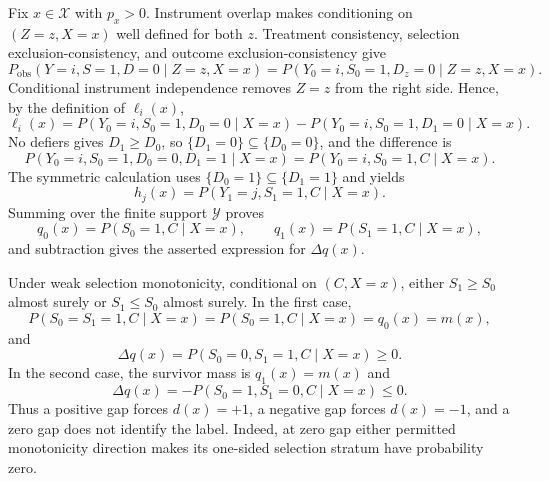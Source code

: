 Fix \(x\in\mathcal X\) with \(p_x>0\).  Instrument overlap makes conditioning on \((Z=z,X=x)\) well defined for both \(z\).  Treatment consistency, selection exclusion-consistency, and outcome exclusion-consistency give
\[
P_{\mathrm{obs}}(Y=i,S=1,D=0\mid Z=z,X=x)
=P(Y_0=i,S_0=1,D_z=0\mid Z=z,X=x).
\]
Conditional instrument independence removes \(Z=z\) from the right side.  Hence, by the definition of \(\ell_i(x)\),
\[
\ell_i(x)=P(Y_0=i,S_0=1,D_0=0\mid X=x)-P(Y_0=i,S_0=1,D_1=0\mid X=x).
\]
No defiers gives \(D_1\ge D_0\), so \(\{D_1=0\}\subseteq\{D_0=0\}\), and the difference is
\[
P(Y_0=i,S_0=1,D_0=0,D_1=1\mid X=x)=P(Y_0=i,S_0=1,C\mid X=x).
\]
The symmetric calculation uses \(\{D_0=1\}\subseteq\{D_1=1\}\) and yields
\[
h_j(x)=P(Y_1=j,S_1=1,C\mid X=x).
\]
Summing over the finite support \(\mathcal Y\) proves
\[
q_0(x)=P(S_0=1,C\mid X=x),\qquad q_1(x)=P(S_1=1,C\mid X=x),
\]
and subtraction gives the asserted expression for \(\Delta q(x)\).

Under weak selection monotonicity, conditional on \((C,X=x)\), either \(S_1\ge S_0\) almost surely or \(S_1\le S_0\) almost surely.  In the first case,
\[
P(S_0=S_1=1,C\mid X=x)=P(S_0=1,C\mid X=x)=q_0(x)=m(x),
\]
and
\[
\Delta q(x)=P(S_0=0,S_1=1,C\mid X=x)\ge0.
\]
In the second case, the survivor mass is \(q_1(x)=m(x)\) and
\[
\Delta q(x)=-P(S_0=1,S_1=0,C\mid X=x)\le0.
\]
Thus a positive gap forces \(d(x)=+1\), a negative gap forces \(d(x)=-1\), and a zero gap does not identify the label.  Indeed, at zero gap either permitted monotonicity direction makes its one-sided selection stratum have probability zero.